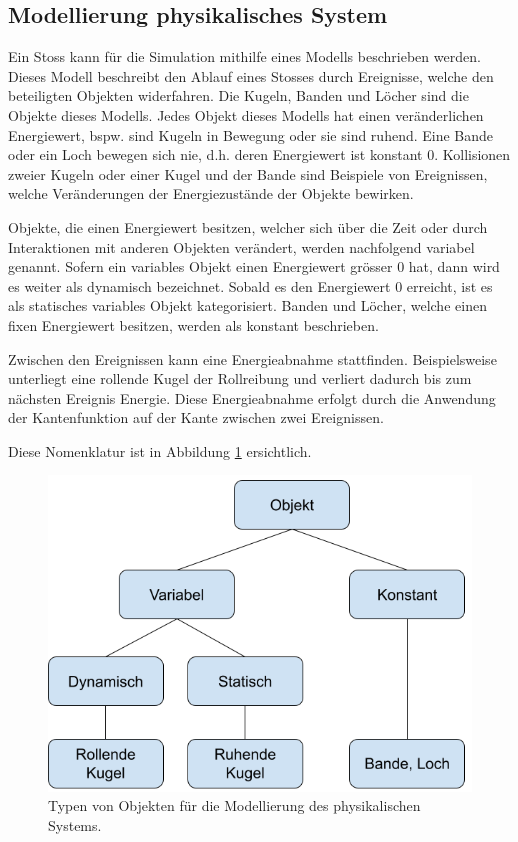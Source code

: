 \subsection{Modellierung physikalisches System}\label{kap:physikalisches_system}
Ein Stoss kann für die Simulation mithilfe eines Modells beschrieben werden.
Dieses Modell beschreibt den Ablauf eines Stosses durch Ereignisse, welche den beteiligten Objekten widerfahren.
Die Kugeln, Banden und Löcher sind die Objekte dieses Modells.
Jedes Objekt dieses Modells hat einen veränderlichen Energiewert, bspw. sind Kugeln in Bewegung oder sie sind ruhend.
Eine Bande oder ein Loch bewegen sich nie, d.h. deren Energiewert ist konstant 0.
Kollisionen zweier Kugeln oder einer Kugel und der Bande sind Beispiele von Ereignissen, welche Veränderungen
der Energiezustände der Objekte bewirken.

Objekte, die einen Energiewert besitzen, welcher sich über die Zeit oder durch Interaktionen mit anderen Objekten verändert,
werden nachfolgend variabel genannt. Sofern ein variables Objekt einen Energiewert grösser 0 hat,
dann wird es weiter als dynamisch bezeichnet. Sobald es den Energiewert 0 erreicht, ist es als statisches
variables Objekt kategorisiert.
Banden und Löcher, welche einen fixen Energiewert besitzen, werden als konstant beschrieben.

Zwischen den Ereignissen kann eine Energieabnahme stattfinden. Beispielsweise unterliegt eine rollende Kugel der
Rollreibung und verliert dadurch bis zum nächsten Ereignis Energie.
Diese Energieabnahme erfolgt durch die Anwendung der Kantenfunktion auf der Kante zwischen zwei Ereignissen.

Diese Nomenklatur ist in Abbildung \ref{fig:physical_model_object_categories} ersichtlich.

\begin{figure}[h!]
    \begin{center}
        \includegraphics[width=0.5\linewidth]{../common/03_billiard_ai/resources/17_physical_model_categories.png}
    \end{center}
    \caption{Typen von Objekten für die Modellierung des physikalischen Systems.}
    \label{fig:physical_model_object_categories}
\end{figure}

